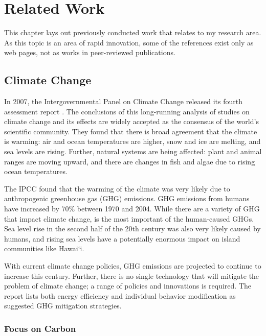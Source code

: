 \chapter{Related Work}

This chapter lays out previously conducted work that relates to my research area. As this topic is an area of rapid innovation, some of the references exist only as web pages, not as works in peer-reviewed publications. 

\section{Climate Change}
\label{sec:climate-change}

In 2007, the Intergovernmental Panel on Climate Change released its fourth assessment report \cite{IPCC-synthesis-report-2007}. The conclusions of this long-running analysis of studies on climate change and its effects are widely accepted as the consensus of the world's scientific community. They found that there is broad agreement that the climate is warming: air and ocean temperatures are higher, snow and ice are melting, and sea levels are rising. Further, natural systems are being affected: plant and animal ranges are moving upward, and there are changes in fish and algae due to rising ocean temperatures.

The IPCC found that the warming of the climate was very likely due to anthropogenic greenhouse gas (GHG) emissions. GHG emissions from humans have increased by 70\% between 1970 and 2004. While there are a variety of GHG that impact climate change, \COtwo is the most important of the human-caused GHGs. Sea level rise in the second half of the 20th century was also very likely caused by humans, and rising sea levels have a potentially enormous impact on island communities like Hawai`i.

With current climate change policies, GHG emissions are projected to continue to increase this century. Further, there is no single technology that will mitigate the problem of climate change; a range of policies and innovations is required. The report lists both energy efficiency and individual behavior modification as suggested GHG mitigation strategies.

\subsection{Focus on Carbon}

